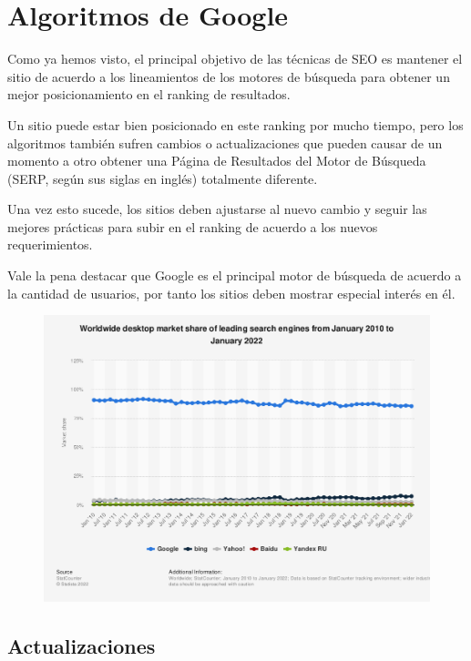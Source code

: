\documentclass[12pt]{llncs}
\begin{document}
\section{Algoritmos de Google}

Como ya hemos visto, el principal objetivo de las técnicas de SEO es mantener el sitio de acuerdo a los lineamientos de los motores de búsqueda para obtener un mejor posicionamiento en el ranking de resultados.

Un sitio puede estar bien posicionado en este ranking por mucho tiempo, pero los algoritmos también sufren cambios o actualizaciones que pueden causar de un momento a otro obtener una Página de Resultados del Motor de Búsqueda (SERP, según sus siglas en inglés) totalmente diferente.

Una vez esto sucede, los sitios deben ajustarse al nuevo cambio y seguir las mejores prácticas para subir en el ranking de acuerdo a los nuevos requerimientos.

Vale la pena destacar que Google es el principal motor de búsqueda de acuerdo a la cantidad de usuarios, por tanto los sitios deben mostrar especial interés en él.

\newpage

\begin{figure}[!h]
    \centering
    \includegraphics[width=\linewidth]{images/216573.png}
  \end{figure}
\subsection{Actualizaciones}
\end{document}
